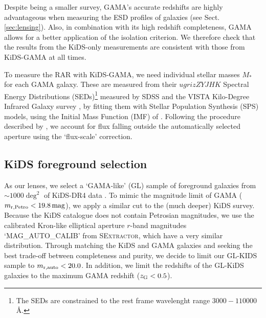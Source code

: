 \documentclass[usenatbib]{mnras}
\newcommand{\magn}{\, {\rm mag} }
\newcommand{\un}[1]{_{\rm #1}}
\begin{document}
Despite being a smaller survey, GAMA's accurate redshifts are highly advantageous when measuring the ESD profiles of galaxies (see Sect. \ref{sec:lensing}). Also, in combination with its high redshift completeness, GAMA allows for a better application of the isolation criterion. We therefore check that the results from the KiDS-only measurements are consistent with those from KiDS-GAMA at all times.

To measure the RAR with KiDS-GAMA, we need individual stellar masses $M_*$ for each GAMA galaxy. These are measured from their $ugrizZYJHK$ Spectral Energy Distributions (SEDs)\footnote{The SEDs are constrained to the rest frame wavelenght range $3000-110000$ \AA.} measured by SDSS and the VISTA Kilo-Degree Infrared Galaxy survey \cite[VIKING,][]{edge2013}, by fitting them with \cite{bruzual2003} Stellar Population Synthesis (SPS) models, using the Initial Mass Function (IMF) of \cite{chabrier2003}. Following the procedure described by \cite{taylor2011}, we account for flux falling outside the automatically selected aperture using the `flux-scale' correction.

\subsection{KiDS foreground selection}
\label{sec:gamalike_kids}

As our lenses, we select a `GAMA-like' (GL) sample of foreground galaxies from $\sim1000 \deg^2$ of KiDS-DR4 data \cite[]{kuijken2019}. To mimic the magnitude limit of GAMA ($m\un{r,Petro}<19.8 \magn$), we apply a similar cut to the (much deeper) KiDS survey. Because the KiDS catalogue does not contain Petrosian magnitudes, we use the calibrated Kron-like elliptical aperture $r$-band magnitudes `MAG\_AUTO\_CALIB' from \textsc{SExtractor}, which have a very similar distribution. Through matching the KiDS and GAMA galaxies and seeking the best trade-off between completeness and purity, we decide to limit our GL-KIDS sample to $m\un{r,auto}<20.0$. In addition, we limit the redshifts of the GL-KiDS galaxies to the maximum GAMA redshift ($z\un{G}<0.5$).
\end{document}
